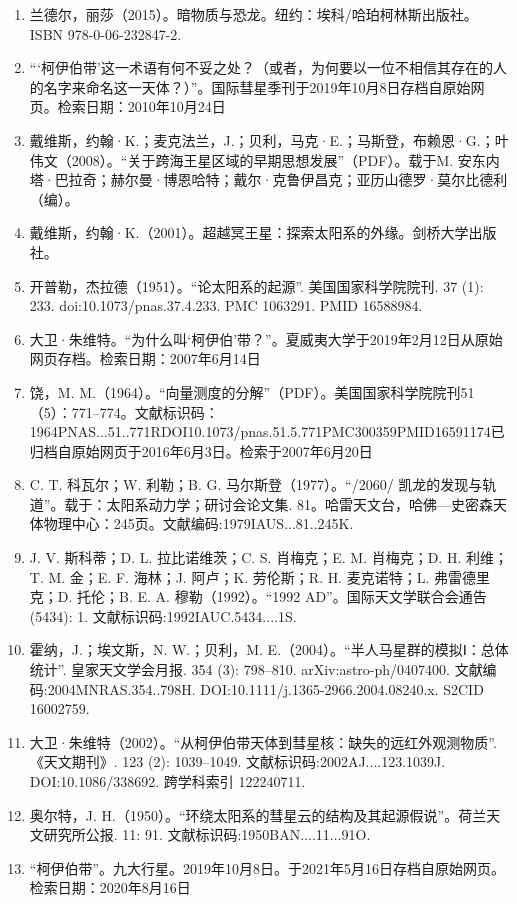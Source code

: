 \begin{enumerate}
\item 兰德尔，丽莎（2015）。暗物质与恐龙。纽约：埃科/哈珀柯林斯出版社。ISBN 978-0-06-232847-2.
\item “‘柯伊伯带’这一术语有何不妥之处？（或者，为何要以一位不相信其存在的人的名字来命名这一天体？）”。国际彗星季刊于2019年10月8日存档自原始网页。检索日期：2010年10月24日
\item 戴维斯，约翰·K.；麦克法兰，J.；贝利，马克·E.；马斯登，布赖恩·G.；叶伟文（2008）。“关于跨海王星区域的早期思想发展”（PDF）。载于M. 安东内塔·巴拉奇；赫尔曼·博恩哈特；戴尔·克鲁伊昌克；亚历山德罗·莫尔比德利（编）。
\item 戴维斯，约翰·K.（2001）。超越冥王星：探索太阳系的外缘。剑桥大学出版社。
\item 开普勒，杰拉德（1951）。“论太阳系的起源”. 美国国家科学院院刊. 37 (1): 233. doi:10.1073/pnas.37.4.233. PMC 1063291. PMID 16588984.
\item 大卫·朱维特。“为什么叫‘柯伊伯’带？”。夏威夷大学于2019年2月12日从原始网页存档。检索日期：2007年6月14日
\item 饶，M. M.（1964）。“向量测度的分解”（PDF）。美国国家科学院院刊51（5）：771–774。文献标识码：1964PNAS...51..771RDOI10.1073/pnas.51.5.771PMC300359PMID16591174已归档自原始网页于2016年6月3日。检索于2007年6月20日
\item C. T. 科瓦尔；W. 利勒；B. G. 马尔斯登（1977）。“/2060/ 凯龙的发现与轨道”。载于：太阳系动力学；研讨会论文集. 81。哈雷天文台，哈佛—史密森天体物理中心：245页。文献编码:1979IAUS...81..245K.
\item J. V. 斯科蒂；D. L. 拉比诺维茨；C. S. 肖梅克；E. M. 肖梅克；D. H. 利维；T. M. 金；E. F. 海林；J. 阿卢；K. 劳伦斯；R. H. 麦克诺特；L. 弗雷德里克；D. 托伦；B. E. A. 穆勒（1992）。“1992 AD”。国际天文学联合会通告 (5434): 1. 文献标识码:1992IAUC.5434....1S.
\item 霍纳，J.；埃文斯，N. W.；贝利，M. E.（2004）。“半人马星群的模拟Ⅰ：总体统计”. 皇家天文学会月报. 354 (3): 798–810. arXiv:astro-ph/0407400. 文献编码:2004MNRAS.354..798H. DOI:10.1111/j.1365-2966.2004.08240.x. S2CID 16002759.
\item 大卫·朱维特（2002）。“从柯伊伯带天体到彗星核：缺失的远红外观测物质”. 《天文期刊》. 123 (2): 1039–1049. 文献标识码:2002AJ....123.1039J. DOI:10.1086/338692. 跨学科索引 122240711.
\item 奥尔特，J. H.（1950）。“环绕太阳系的彗星云的结构及其起源假说”。荷兰天文研究所公报. 11: 91. 文献标识码:1950BAN....11...91O.
\item “柯伊伯带”。九大行星。2019年10月8日。于2021年5月16日存档自原始网页。检索日期：2020年8月16日

\end{enumerate}

